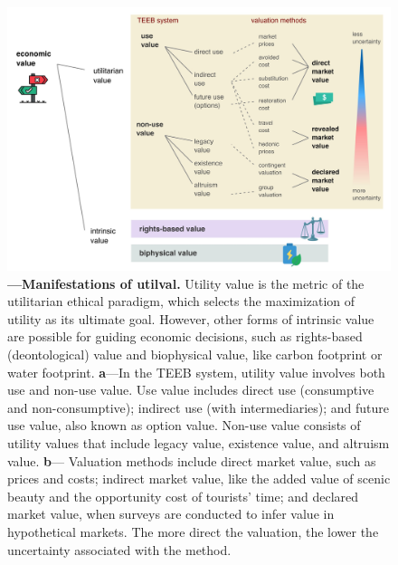\documentclass[./main_en.tex]{subfiles}
\begin{document}
\begin{figure}[t!] 
\centering				
\includegraphics[width=0.98\linewidth]{figs/fig_teeb_en.jpg}		
\caption[Manifestations of Utility Value]
{\textbf{---\;Manifestations of \gls{utilval}.}
    Utility value is the metric of the utilitarian ethical paradigm, which selects the maximization of utility as its ultimate goal. However, other forms of intrinsic value are possible for guiding economic decisions, such as rights-based (deontological) value and biophysical value, like carbon footprint or water footprint.
    \;\textbf{a}\;---\;In the TEEB system, utility value involves both use and non-use value. Use value includes direct use (consumptive and non-consumptive); indirect use (with intermediaries); and future use value, also known as option value. Non-use value consists of utility values that include legacy value, existence value, and altruism value.
    \;\textbf{b}\;---\; Valuation methods include direct market value, such as prices and costs; indirect market value, like the added value of scenic beauty and the opportunity cost of tourists' time; and declared market value, when surveys are conducted to infer value in hypothetical markets. The more direct the valuation, the lower the uncertainty associated with the method.
}
\label{fig:eco:natserv:value} 		
\end{figure}
\end{document}
